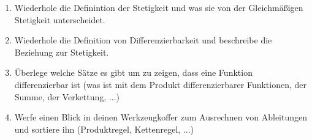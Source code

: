 \begin{exercise}[Wiederholungen]
  \begin{enumerate}[label=(\alph*)]
  \item Wiederhole die Definintion der Stetigkeit und was sie von der
    Gleichmäßigen Stetigkeit unterscheidet.
  \item Wiederhole die Definition von Differenzierbarkeit und beschreibe die
    Beziehung zur Stetigkeit.
  \item Überlege welche Sätze es gibt um zu zeigen, dass eine Funktion
    differenzierbar ist (was ist mit dem Produkt differenzierbarer Funktionen, der
    Summe, der Verkettung, ...)
  \item Werfe einen Blick in deinen Werkzeugkoffer zum Ausrechnen von
    Ableitungen und sortiere ihn (Produktregel, Kettenregel, ...)
  \end{enumerate}
\end{exercise}
